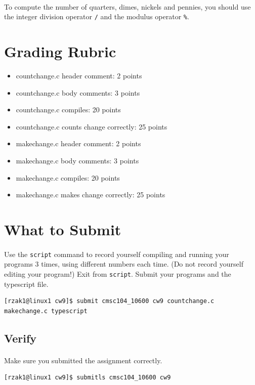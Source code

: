 \documentclass[letter,11pt]{article}
\begin{document}
\paragraph{}To compute the number of quarters, dimes, nickels and pennies, you should use the integer division operator \texttt{/} and the modulus operator \texttt{\%}.

\section*{Grading Rubric}
\begin{itemize}
    \item countchange.c header comment: 2 points
    \item countchange.c body comments: 3 points
    \item countchange.c compiles: 20 points
    \item countchange.c counts change correctly: 25 points
    \item makechange.c header comment: 2 points
    \item makechange.c body comments: 3 points
    \item makechange.c compiles: 20 points
    \item makechange.c makes change correctly: 25 points
\end{itemize}

\section*{What to Submit}
\paragraph{}Use the \texttt{script} command to record yourself compiling and running your programs 3 times, using different numbers each time. (Do not record yourself editing your program!) Exit from \texttt{script}. Submit your programs and the typescript file.

\begin{verbatim}
[rzak1@linux1 cw9]$ submit cmsc104_10600 cw9 countchange.c makechange.c typescript
\end{verbatim}

\subsection*{Verify}
\paragraph{}Make sure you submitted the assignment correctly.
\begin{verbatim}
[rzak1@linux1 cw9]$ submitls cmsc104_10600 cw9
\end{verbatim}
\end{document}
